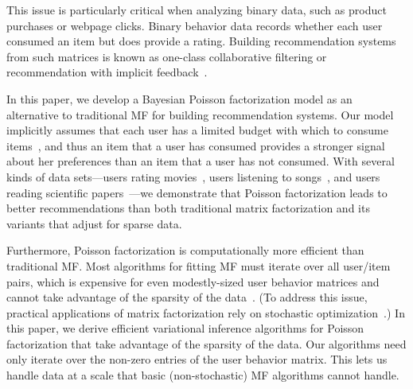\documentclass{sig-alternate}
\begin{document}
This issue is particularly critical when analyzing binary data, such
as product purchases or webpage clicks.  Binary behavior data records
whether each user consumed an item but does provide a rating.
Building recommendation systems from such matrices is known as
one-class collaborative filtering or recommendation with implicit
feedback~\cite{Hu:2008p9402,Paquet:2013p9197}.

In this paper, we develop a Bayesian Poisson factorization model as an
alternative to traditional MF for building recommendation systems.
Our model implicitly assumes that each user has a limited budget with
which to consume items~\cite{Goodhardt:1984}, and thus an item that a
user has consumed provides a stronger signal about her preferences
than an item that a user has not consumed.  With several kinds of data
sets---users rating movies~\cite{Herlocker:1999,Koren:2009}, users
listening to songs~\cite{Bertin-Mahieux:2011}, and users reading
scientific papers~\cite{Jack:2010}---we demonstrate that Poisson
factorization leads to better recommendations than both traditional
matrix factorization and its variants that adjust for sparse data.

Furthermore, Poisson factorization is computationally more efficient
than traditional MF.  Most algorithms for fitting MF must iterate over
all user/item pairs, which is expensive for even modestly-sized user
behavior matrices and cannot take advantage of the sparsity of the
data~\cite{Hu:2008p9402}.  (To address this issue, practical applications of matrix
factorization rely on stochastic optimization~\cite{Mairal:2010}.)  In
this paper, we derive efficient variational inference algorithms for
Poisson factorization that take advantage of the sparsity of the
data. Our algorithms need only iterate over the non-zero entries of
the user behavior matrix.  This lets us handle data at a scale that
basic (non-stochastic) MF algorithms cannot handle.
\end{document}

